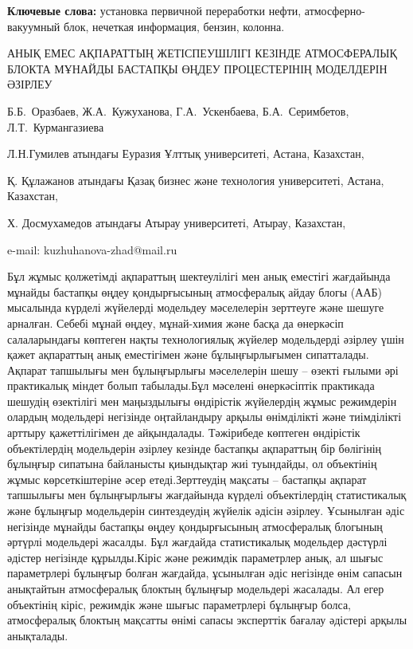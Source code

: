 {\bfseries Ключевые слова:} установка первичной переработки нефти,
атмосферно-вакуумный блок, нечеткая информация, бензин, колонна.

\begin{header}
АНЫҚ ЕМЕС АҚПАРАТТЫҢ ЖЕТІСПЕУШІЛІГІ КЕЗІНДЕ АТМОСФЕРАЛЫҚ БЛОКТА МҰНАЙДЫ БАСТАПҚЫ ӨҢДЕУ ПРОЦЕСТЕРІНІҢ МОДЕЛДЕРІН ӘЗІРЛЕУ

Б.Б.~Оразбаев,
Ж.А.~Кужуханова\envelope,
Г.А.~Ускенбаева,
Б.А.~Серимбетов,
Л.Т.~Курмангазиева
\end{header}

\begin{affil}
Л.Н.Гумилев атындағы Еуразия Ұлттық университеті, Астана, Казахстан,

Қ. Құлажанов атындағы Қазақ бизнес және технология университеті, Астана, Казахстан,

Х. Досмухамедов атындағы Атырау университеті, Атырау, Казахстан,

e-mail: kuzhuhanova-zhad@mail.ru
\end{affil}

Бұл жұмыс қолжетімді ақпараттың шектеулілігі мен анық еместігі
жағдайында мұнайды бастапқы өңдеу қондырғысының атмосфералық айдау блогы
(ААБ) мысалында күрделі жүйелерді модельдеу мәселелерін зерттеуге және
шешуге арналған. Себебі мұнай өңдеу, мұнай-химия және басқа да өнеркәсіп
салаларындағы көптеген нақты технологиялық жүйелер модельдерді әзірлеу
үшін қажет ақпараттың анық еместігімен және бұлыңғырлығымен сипатталады.
Ақпарат тапшылығы мен бұлыңғырлығы мәселелерін шешу -- өзекті ғылыми әрі
практикалық міндет болып табылады.Бұл мәселені өнеркәсіптік практикада
шешудің өзектілігі мен маңыздылығы өндірістік жүйелердің жұмыс
режимдерін олардың модельдері негізінде оңтайландыру арқылы өнімділікті
және тиімділікті арттыру қажеттілігімен де айқындалады. Тәжірибеде
көптеген өндірістік объектілердің модельдерін әзірлеу кезінде бастапқы
ақпараттың бір бөлігінің бұлыңғыр сипатына байланысты қиындықтар жиі
туындайды, ол объектінің жұмыс көрсеткіштеріне әсер етеді.Зерттеудің
мақсаты -- бастапқы ақпарат тапшылығы мен бұлыңғырлығы жағдайында
күрделі объектілердің статистикалық және бұлыңғыр модельдерін
синтездеудің жүйелік әдісін әзірлеу. Ұсынылған әдіс негізінде мұнайды
бастапқы өңдеу қондырғысының атмосфералық блогының әртүрлі модельдері
жасалды. Бұл жағдайда статистикалық модельдер дәстүрлі әдістер негізінде
құрылды.Кіріс және режимдік параметрлер анық, ал шығыс параметрлері
бұлыңғыр болған жағдайда, ұсынылған әдіс негізінде өнім сапасын
анықтайтын атмосфералық блоктың бұлыңғыр модельдері жасалады. Ал егер
объектінің кіріс, режимдік және шығыс параметрлері бұлыңғыр болса,
атмосфералық блоктың мақсатты өнімі сапасы эксперттік бағалау әдістері
арқылы анықталады.

